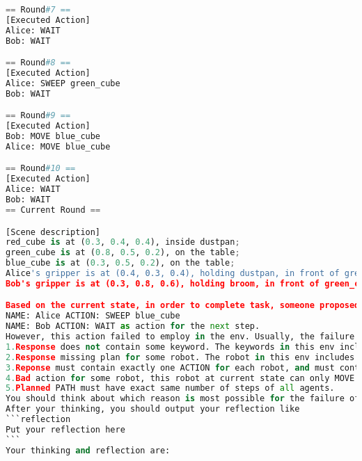 \begin{lstlisting}[language=Python]
== Round#7 ==
[Executed Action]
Alice: WAIT
Bob: WAIT

== Round#8 ==
[Executed Action]
Alice: SWEEP green_cube
Bob: WAIT

== Round#9 ==
[Executed Action]
Bob: MOVE blue_cube
Alice: MOVE blue_cube

== Round#10 ==
[Executed Action]
Alice: WAIT
Bob: WAIT
== Current Round ==

[Scene description]
red_cube is at (0.3, 0.4, 0.4), inside dustpan; 
green_cube is at (0.8, 0.5, 0.2), on the table; 
blue_cube is at (0.3, 0.5, 0.2), on the table; 
Alice's gripper is at (0.4, 0.3, 0.4), holding dustpan, in front of green_cube with distance: 0.53, in front of blue_cube with distance: 0.31
Bob's gripper is at (0.3, 0.8, 0.6), holding broom, in front of green_cube with distance: 0.58, in front of blue_cube with distance: 0.33

Based on the current state, in order to complete task, someone proposed EXECUTE
NAME: Alice ACTION: SWEEP blue_cube
NAME: Bob ACTION: WAIT as action for the next step.
However, this action failed to employ in the env. Usually, the failure may be due to one of the following reasons.
1.Response does not contain some keyword. The keywords in this env includes ['NAME:', 'ACTION:'].
2.Response missing plan for some robot. The robot in this env includes dict_values(['Alice', 'Bob']).
3.Reponse must contain exactly one ACTION for each robot, and must contain all keywords. The keywords in this env includes ['NAME:', 'ACTION:'].
4.Bad action for some robot, this robot at current state can only MOVE or WAIT. The robot in this env includes dict_values(['Alice', 'Bob']).
5.Planned PATH must have exact same number of steps of all agents.
You should think about which reason is most possible for the failure of the past action, you should clearly output the reason to help yourself to genetate better reasoning and action in future.
After your thinking, you should output your reflection like
```reflection
Put your reflection here
```
Your thinking and reflection are:
\end{lstlisting}
